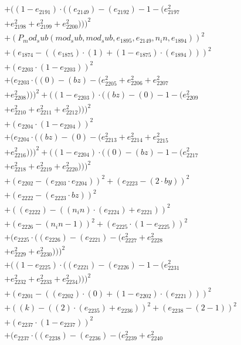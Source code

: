 \documentclass[10pt, a4paper]{article}
\begin{document}
\begin{align*}
& + ((1 - e_{2191})  \cdot  ((e_{2149}) - (e_{2192}) - 1 - (e_{2197}^{2} \\
& + e_{2198}^{2} + e_{2199}^{2} + e_{2200}^{2})))^{2} \\
& + (P_mod_sub(mod_sub, mod_sub, e_{1895}, e_{2149}, n_in, e_{1894}))^{2} \\
& + (e_{1874} - ((e_{1875})  \cdot  (1) + (1 - e_{1875})  \cdot  (e_{1894})))^{2} \\
& + (e_{2203}  \cdot  (1 - e_{2203}))^{2} \\
& + (e_{2203}  \cdot  ((0) - (bz) - (e_{2205}^{2} + e_{2206}^{2} + e_{2207}^{2} \\
& + e_{2208}^{2})))^{2} + ((1 - e_{2203})  \cdot  ((bz) - (0) - 1 - (e_{2209}^{2} \\
& + e_{2210}^{2} + e_{2211}^{2} + e_{2212}^{2})))^{2} \\
& + (e_{2204}  \cdot  (1 - e_{2204}))^{2} \\
& + (e_{2204}  \cdot  ((bz) - (0) - (e_{2213}^{2} + e_{2214}^{2} + e_{2215}^{2} \\
& + e_{2216}^{2})))^{2} + ((1 - e_{2204})  \cdot  ((0) - (bz) - 1 - (e_{2217}^{2} \\
& + e_{2218}^{2} + e_{2219}^{2} + e_{2220}^{2})))^{2} \\
& + (e_{2202} - (e_{2203}  \cdot  e_{2204}))^{2} + (e_{2223} - (2  \cdot  by))^{2} \\
& + (e_{2222} - (e_{2223}  \cdot  bz))^{2} \\
& + ((e_{2222}) - ((n_in)  \cdot  (e_{2224}) + e_{2221}))^{2} \\
& + (e_{2226} - (n_in - 1))^{2} + (e_{2225}  \cdot  (1 - e_{2225}))^{2} \\
& + (e_{2225}  \cdot  ((e_{2226}) - (e_{2221}) - (e_{2227}^{2} + e_{2228}^{2} \\
& + e_{2229}^{2} + e_{2230}^{2})))^{2} \\
& + ((1 - e_{2225})  \cdot  ((e_{2221}) - (e_{2226}) - 1 - (e_{2231}^{2} \\
& + e_{2232}^{2} + e_{2233}^{2} + e_{2234}^{2})))^{2} \\
& + (e_{2201} - ((e_{2202})  \cdot  (0) + (1 - e_{2202})  \cdot  (e_{2221})))^{2} \\
& + ((k) - ((2)  \cdot  (e_{2235}) + e_{2236}))^{2} + (e_{2238} - (2 - 1))^{2} \\
& + (e_{2237}  \cdot  (1 - e_{2237}))^{2} \\
& + (e_{2237}  \cdot  ((e_{2238}) - (e_{2236}) - (e_{2239}^{2} + e_{2240}^{2} \\

\end{align*}
\end{document}

